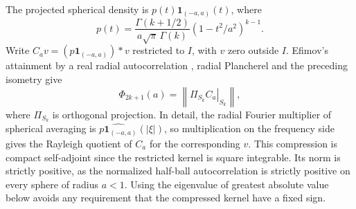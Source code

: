 \documentclass[11pt,a4paper]{article}
\numberwithin{equation}{section}
\begin{document}
The projected spherical density is $p(t)\mathbf1_{(-a,a)}(t)$, where
\[
 p(t)=\frac{\Gamma(k+1/2)}{a\sqrt\pi\,\Gamma(k)}(1-t^2/a^2)^{k-1}.
\]
Write $C_a v=(p\mathbf1_{(-a,a)})*v$ restricted to $I$, with $v$ zero outside $I$. Efimov's attainment by a real radial autocorrelation \cite[Theorem~3]{EfimovSphere}, radial Plancherel and the preceding isometry give
\begin{equation}
 \Phi_{2k+1}(a)=\left\|\left.\Pi_{S_k} C_a\right|_{S_k}\right\|,
 \label{eq:odd-compression}
\end{equation}
where $\Pi_{S_k}$ is orthogonal projection. In detail, the radial Fourier multiplier of spherical averaging is $\widehat{p\mathbf1_{(-a,a)}}(|\xi|)$, so multiplication on the frequency side gives the Rayleigh quotient of $C_a$ for the corresponding $v$. This compression is compact self-adjoint since the restricted kernel is square integrable. Its norm is strictly positive, as the normalized half-ball autocorrelation is strictly positive on every sphere of radius $a<1$. Using the eigenvalue of greatest absolute value below avoids any requirement that the compressed kernel have a fixed sign.
\end{document}
